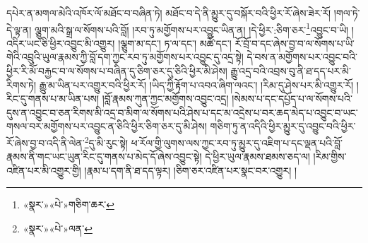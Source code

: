 དཔེར་ན་མགལ་མེའི་འཁོར་ལོ་མཐོང་བ་བཞིན་ཏེ། མཐོང་བ་དེ་ནི་མྱུར་དུ་བསྐོར་བའི་ཕྱིར་རོ་ཞེས་ཟེར་རོ། །གལ་ཏེ་དེ་ལྟ་ན། ལྕུག་མའི་སྒྲ་ལ་སོགས་པའི་བློ། །རབ་ཏུ་མགྱོགས་པར་འབྱུང་ཡིན་ན། །དེ་ཕྱིར་:ཅིག་ཅར་\footnote{«སྣར་»«པེ་»གཅིག་ཆར་}འབྱུང་བ་ཡི། །འདིར་ཡང་ཅི་ཕྱིར་འབྱུང་མི་འགྱུར། །ལྕུག་མ་དང་། ཏ་ལ་དང་། མཚོ་དང་། རོ་བྲོ་བ་དང་ཞེས་བྱ་བ་ལ་སོགས་པ་ཡི་གེའི་འབྲུའི་ཡུལ་རྣམས་ཀྱི་བློ་དག་ཀྱང་རབ་ཏུ་མགྱོགས་པར་འབྱུང་དུ་འདྲ་སྟེ། དེ་བས་ན་མགྱོགས་པར་འབྱུང་བའི་ཕྱིར་རི་མོ་བརྐྱང་བ་ལ་སོགས་པ་བཞིན་དུ་ཅིག་ཅར་དུ་ཅིའི་ཕྱིར་མི་ཤེས། རྒྱུ་འདྲ་བའི་འབྲས་བུ་ནི་ཐ་དད་པར་མི་རིགས་ཏེ། རྒྱུ་མ་ཡིན་པར་འགྱུར་བའི་ཕྱིར་རོ། །ཡིད་ཀྱི་རྟོག་པ་འབའ་ཞིག་ལའང་། །རིམ་དུ་ཤེས་པར་མི་འགྱུར་རོ། །རིང་དུ་གནས་པ་མ་ཡིན་པས། །བློ་རྣམས་ཀུན་ཀྱང་མགྱོགས་འབྱུང་འདྲ། །སེམས་པ་དང་དཔྱོད་པ་ལ་སོགས་པའི་དུས་ན་འབྱུང་བ་ཅན་རིགས་མི་འདྲ་བ་མིག་ལ་སོགས་པའི་ཤེས་པ་དང་མ་འདྲེས་པ་བར་ཆད་མེད་པ་འབྱུང་བ་ཡང་གསལ་བར་མགྱོགས་པར་འབྱུང་ན་ཅིའི་ཕྱིར་ཅིག་ཅར་དུ་མི་ཤེས། གཅིག་ཏུ་ན་འདིའི་ཕྱིར་མྱུར་དུ་འབྱུང་བའི་ཕྱིར་རོ་ཞེས་བྱ་བ་འདི་ནི་ལེན་\footnote{«སྣར་»«པེ་»ལན་}དུ་མི་རུང་སྟེ། ཕ་རོལ་གྱི་ལུགས་ལས་ཀྱང་རབ་ཏུ་མྱུར་དུ་འཇིག་པ་དང་ལྡན་པའི་བློ་རྣམས་ནི་གང་ཡང་ཡུན་རིང་དུ་གནས་པ་མེད་དོ་ཞེས་འབྱུང་སྟེ། དེ་ཕྱིར་ཡུལ་རྣམས་ཐམས་ཅད་ལ། །རིམ་གྱིས་འཛིན་པར་མི་འགྱུར་གྱི། །རྣམ་པ་དག་ནི་ཐ་དད་ལྟར། །ཅིག་ཅར་འཛིན་པར་སྣང་བར་འགྱུར། །
